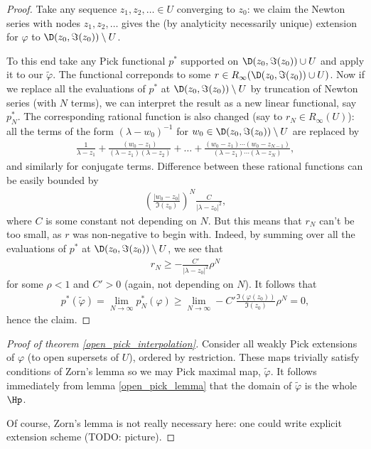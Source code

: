 \begin{proof}
	Take any sequence $z_{1}, z_{2}, \ldots \in U$ converging to $z_{0}$: we claim the Newton series with nodes $z_{1}, z_{2}, \ldots$ gives the (by analyticity necessarily unique) extension for $\varphi$ to $\D(z_{0}, \Im(z_{0})) \setminus U$.

	To this end take any Pick functional $p^{*}$ supported on  $\D(z_{0}, \Im(z_{0})) \cup U$ and apply it to our $\tilde{\varphi}$. The functional correponds to some $r \in R_{\infty}(\D(z_{0}, \Im(z_{0})) \cup U)$. Now if we replace all the evaluations of $p^{*}$ at $\D(z_{0}, \Im(z_{0})) \setminus U$ by truncation of Newton series (with $N$ terms), we can interpret the result as a new linear functional, say $p^{*}_{N}$. The corresponding rational function is also changed (say to $r_{N} \in R_{\infty}(U)$): all the terms of the form $(\lambda - w_{0})^{-1}$ for $w_{0} \in \D(z_{0}, \Im(z_{0})) \setminus U$ are replaced by
	\begin{align*}
		\frac{1}{\lambda - z_{1}} + \frac{(w_{0} - z_{1})}{(\lambda - z_{1}) (\lambda - z_{2})} + \ldots + \frac{(w_{0} - z_{1})\cdots (w_{0} - z_{N - 1})}{(\lambda - z_{1})\cdots (\lambda - z_{N})},
	\end{align*}
	and similarly for conjugate terms. Difference between these rational functions can be easily bounded by
	\begin{align*}
		\left(\frac{|w_{0} - z_{0}|}{\Im(z_{0})}\right)^{N}\frac{C}{|\lambda - z_{0}|^2},
	\end{align*}
	where $C$ is some constant not depending on $N$. But this means that $r_{N}$ can't be too small, as $r$ was non-negative to begin with. Indeed, by summing over all the evaluations of $p^{*}$ at $\D(z_{0}, \Im(z_{0})) \setminus U$, we see that
	\begin{align*}
		r_{N} \geq -\frac{C'}{|\lambda - z_{0}|^2} \rho^{N}
	\end{align*}
	for some $\rho < 1$ and $C' > 0$ (again, not depending on $N$). It follows that
	\begin{align*}
		p^{*}(\tilde{\varphi}) = \lim_{N \to \infty} p^{*}_{N}(\varphi) \geq \lim_{N \to \infty} -C' \frac{\Im(\varphi(z_{0}))}{\Im(z_{0})} \rho^{N} = 0,
	\end{align*}
	hence the claim.
\end{proof}


\begin{proof}[Proof of theorem \ref{open_pick_interpolation}]
	Consider all weakly Pick extensions of $\varphi$ (to open supersets of $U$), ordered by restriction. These maps trivially satisfy conditions of Zorn's lemma so we may Pick maximal map, $\tilde{\varphi}$. It follows immediately from lemma \ref{open_pick_lemma} that the domain of $\tilde{\varphi}$ is the whole $\Hp$.

	Of course, Zorn's lemma is not really necessary here: one could write explicit extension scheme (TODO: picture).
\end{proof}

